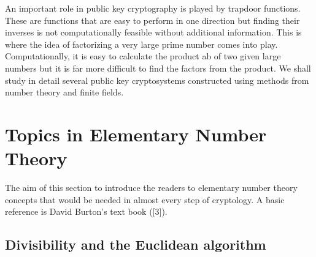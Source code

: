 \documentclass[12pt]{article}
\begin{document}
An important role in public key cryptography is played by trapdoor
functions.  These are functions that are easy to perform in one
direction but finding their inverses is not computationally feasible
without additional information.  This is where the idea of
factorizing a very large prime number comes into play.
Computationally,  it is easy to calculate the product ab of two
given large numbers but it is far more difficult to find the factors
from the product. We shall study in detail several public key
cryptosystems constructed using methods from number theory and
finite fields.





\section{Topics in Elementary Number Theory}

The aim of this section to introduce the readers to elementary
number theory concepts that would be needed in almost every step of
cryptology. A basic reference is David Burton's text book ([3]).

         \subsection{Divisibility and the Euclidean algorithm}
\end{document}
